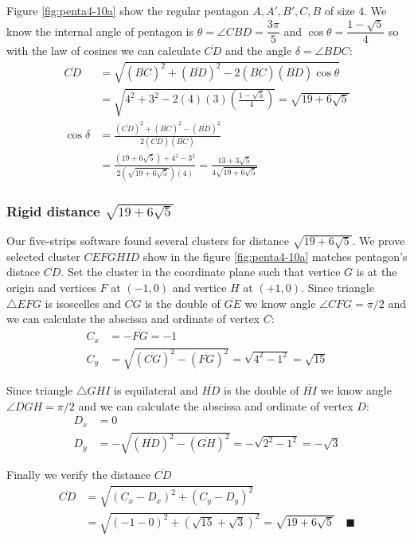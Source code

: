 \documentclass[11pt]{article}
\begin{document}
Figure \ref{fig:penta4-10a} show the regular pentagon $A,A',B',C,B$ of size $4$. We know the internal angle of pentagon is $\theta=\angle{CBD}=\dfrac{3\pi}5$ and $\cos\theta=\dfrac{1-\sqrt5}4$ so with the law of cosines we can calculate $\overline{CD}$ and the angle $\delta = \angle{BDC}$:
\begin{align}
\overline{CD} &= \sqrt{(\overline{BC})^2 + (\overline{BD})^2
 - 2(\overline{BC})(\overline{BD})\cos\theta} \nonumber\\
 &= \sqrt{4^2 + 3^2 - 2(4)(3)\left(\frac{1-\sqrt5}4\right)} = \sqrt{19+6\sqrt5}\\
%
\cos\delta &= \frac{(\overline{CD})^2 + (\overline{BC})^2 - (\overline{BD})^2}
 {2(\overline{CD})(\overline{BC})} \nonumber\\
 &= \frac{(19+6\sqrt5) + 4^2 - 3^2}{2\left(\sqrt{19+6\sqrt5}\right)(4)}
  = \frac{13 + 3\sqrt5}{4\sqrt{19+6\sqrt5}}
\end{align}

\subsubsection{Rigid distance  $\sqrt{19+6\sqrt5}$}

Our five-strips software found several clusters for distance $\sqrt{19+6\sqrt5}$. We prove selected cluster $CEFGHID$ show in the figure \ref{fig:penta4-10a} matches pentagon's distace $\overline{CD}$. Set the cluster in the coordinate plane such that vertice $G$ is at the origin and vertices $F$ at $(-1,0)$ and vertice $H$ at $(+1,0)$.
Since triangle $\triangle{EFG}$ is isoscelles and $\overline{CG}$ is the double of $\overline{GE}$ we know angle $\angle{CFG} = \pi / 2$ and we can calculate the abscissa and ordinate of vertex $C$:
\begin{align}
C_x &= -\overline{FG} = -1 \\
C_y &= \sqrt{(\overline{CG})^2 - (\overline{FG})^2} = \sqrt{4^2 - 1^2} = \sqrt{15}
\end{align}

Since triangle $\triangle{GHI}$ is equilateral and $\overline{HD}$ is the double of $\overline{HI}$ we know angle $\angle{DGH} = \pi / 2$ and we can calculate the abscissa and ordinate of vertex $D$:
\begin{align}
D_x &= 0 \\
D_y &= -\sqrt{(\overline{HD})^2 - (\overline{GH})^2} = -\sqrt{2^2 - 1^2} = -\sqrt3
\end{align}

Finally we verify the distance $\overline{CD}$
\begin{align}
\overline{CD} &= \sqrt{(C_x - D_x)^2 + (C_y - D_y)^2} \nonumber\\
 &= \sqrt{(-1 - 0)^2 + (\sqrt{15} + \sqrt{3})^2} = \sqrt{19 + 6\sqrt5} \quad\blacksquare
\end{align}
\end{document}
